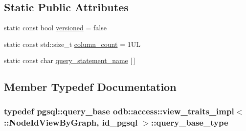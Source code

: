 \subsection*{Static Public Attributes}
\begin{DoxyCompactItemize}
\item 
static const bool \hyperlink{classodb_1_1access_1_1view__traits__impl_3_01_1_1_node_id_view_by_graph_00_01id__pgsql_01_4_a80d38be4caf64e5bf706dcd1fee086a0}{versioned} = false
\item 
static const std\+::size\+\_\+t \hyperlink{classodb_1_1access_1_1view__traits__impl_3_01_1_1_node_id_view_by_graph_00_01id__pgsql_01_4_a7e1530aece76aec8b796ac2c9be7645a}{column\+\_\+count} = 1\+U\+L
\item 
static const char \hyperlink{classodb_1_1access_1_1view__traits__impl_3_01_1_1_node_id_view_by_graph_00_01id__pgsql_01_4_aac817e96b328c64879030ff16444a238}{query\+\_\+statement\+\_\+name} \mbox{[}$\,$\mbox{]}
\end{DoxyCompactItemize}


\subsection{Member Typedef Documentation}
\hypertarget{classodb_1_1access_1_1view__traits__impl_3_01_1_1_node_id_view_by_graph_00_01id__pgsql_01_4_a1394bf86fb77ecf82ccb3f6505fb67ec}{}
\subsubsection[{query\+\_\+base\+\_\+type}]{\setlength{\rightskip}{0pt plus 5cm}typedef pgsql\+::query\+\_\+base odb\+::access\+::view\+\_\+traits\+\_\+impl$<$ \+::{\bf Node\+Id\+View\+By\+Graph}, id\+\_\+pgsql $>$\+::{\bf query\+\_\+base\+\_\+type}}\label{classodb_1_1access_1_1view__traits__impl_3_01_1_1_node_id_view_by_graph_00_01id__pgsql_01_4_a1394bf86fb77ecf82ccb3f6505fb67ec}
\hypertarget{classodb_1_1access_1_1view__traits__impl_3_01_1_1_node_id_view_by_graph_00_01id__pgsql_01_4_a97f413f80b7f77bacf9b0fa363498946}{}
